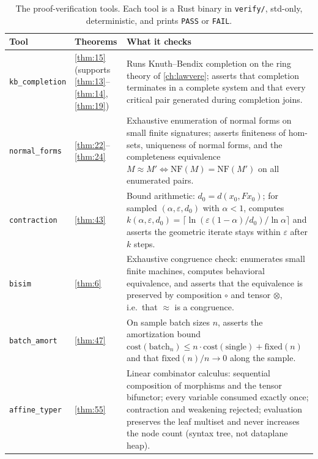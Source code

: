 \begin{table}[!htbp]
\centering
\caption{The proof-verification tools. Each tool is a Rust binary in \texttt{verify/}, std-only, deterministic, and prints \texttt{PASS} or \texttt{FAIL}.}
\label{tab:verify-tools}
\small
\begin{tabular}{@{}llp{7.6cm}@{}}
\toprule
Tool & Theorems & What it checks\\
\midrule
\texttt{kb\_completion} & \ref{thm:15} (supports \ref{thm:13}--\ref{thm:14}, \ref{thm:19}) & Runs Knuth--Bendix completion on the ring theory of \autoref{ch:lawvere}; asserts that completion terminates in a complete system and that every critical pair generated during completion joins.\\
\texttt{normal\_forms} & \ref{thm:22}--\ref{thm:24} & Exhaustive enumeration of normal forms on small finite signatures; asserts finiteness of hom-sets, uniqueness of normal forms, and the completeness equivalence $M \approx M' \iff \mathrm{NF} (M) = \mathrm{NF} (M')$ on all enumerated pairs.\\
\texttt{contraction} & \ref{thm:43} & Bound arithmetic: $d_0 = d (x_0, F x_0)$; for sampled $(\alpha, \varepsilon, d_0)$ with $\alpha < 1$, computes $k (\alpha,\varepsilon,d_0) = \lceil \ln (\varepsilon (1-\alpha)/d_0)/\ln\alpha\rceil$ and asserts the geometric iterate stays within $\varepsilon$ after $k$ steps.\\
\texttt{bisim} & \ref{thm:6} & Exhaustive congruence check: enumerates small finite machines, computes behavioral equivalence, and asserts that the equivalence is preserved by composition $\circ$ and tensor $\otimes$, i.e.\ that $\approx$ is a congruence.\\
\texttt{batch\_amort} & \ref{thm:47} & On sample batch sizes $n$, asserts the amortization bound $\mathrm{cost} (\mathrm{batch}_n) \le n\cdot\mathrm{cost} (\mathrm{single}) + \mathrm{fixed} (n)$ and that $\mathrm{fixed} (n)/n \to 0$ along the sample.\\
\texttt{affine\_typer} & \ref{thm:55} & Linear combinator calculus: sequential composition of morphisms and the tensor bifunctor; every variable consumed exactly once; contraction and weakening rejected; evaluation preserves the leaf multiset and never increases the node count (syntax tree, not dataplane heap).\\
\bottomrule
\end{tabular}
\end{table}

